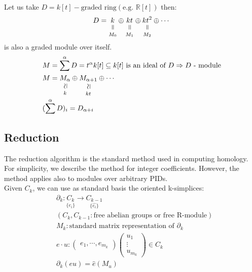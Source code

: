 \documentclass[11pt,a4paper]{report}
\newcommand{\verteq}{\rotatebox{90}{$\,=$}}
\newcommand{\vertsimeq}{\rotatebox{90}{$\,\simeq$}}
\newcommand{\equalto}[2]{\underset{\scriptstyle\overset{\mkern4mu\verteq}{#2}}{#1}}
\newcommand{\simequalto}[2]{\underset{\scriptstyle\overset{\mkern4mu\vertsimeq}{#2}}{#1}}
\begin{document}
              \begin{Ex}
               Let us take $D = k[t] - \textrm{graded ring} (\textrm{e.g. } \mathbb{R}[t])$
               then:
               \[
                D = \equalto{k}{M_0} \oplus \equalto{kt}{M_1} \oplus \equalto{kt^2}{M_2} \oplus \cdots
                \]
                is also a graded module over itself.
              \begin{align*}
                &M = \sum^\alpha D = t^\alpha k[t] \subseteq k[t] \textrm{  is an ideal of } D \Rightarrow D \textrm{ - module}\\
                &M = \simequalto{M_\alpha}{k} \oplus \simequalto{M_{\alpha+1}}{kt} \oplus \cdots\\
                &(\sum^\alpha D)_i = D_{\alpha+i}\\
              \end{align*}
              \end{Ex}

              \subsection{Reduction}

              The reduction algorithm is the standard method used in computing homology. For simplicity,
              we describe the method for integer coefficients. However, the method applies also to modules over arbitrary PIDs. \\

              Given $C_k$, we can use as standard basis the oriented k-simplices:
              \begin{align*}
                &\partial_k: \underset{\{e_i\}}{C_k} \rightarrow \underset{\{\hat{e_i}\}}{C_{k-1}}\\
                &(C_{k}, C_{k-1}: \textrm{free abelian groups or free R-module})\\
                & M_k: \textrm{standard matrix representation of } \partial_k\\
                &e \cdot u: {\begin{pmatrix}e_1, \cdots, e_{m_k}\end{pmatrix}}{\begin{pmatrix}u_1\\\vdots\\u_{m_k}\end{pmatrix}} \in C_k\\
                &\partial_k(eu) = \hat{e}(M_u)\\
              \end{align*}
\end{document}
